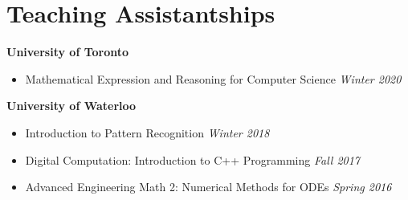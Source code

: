 \section*{Teaching Assistantships}
    \vspace{\postsubhead}
    \textbf{University of Toronto}
      \begin{itemize}
        \item Mathematical Expression and Reasoning for Computer Science
          \hfill
      	 \textit{Winter 2020}
      \end{itemize}
    \textbf{University of Waterloo}
      \begin{itemize}
        \item Introduction to Pattern Recognition
          \hfill
      	 \textit{Winter 2018}
      \end{itemize}
	
      \begin{itemize}
        \item Digital Computation: Introduction to C++ Programming
          \hfill
      	 \textit{Fall 2017}

      \end{itemize}
      \begin{itemize}
        \item Advanced Engineering Math 2: Numerical Methods for ODEs
          \hfill
      	 \textit{Spring 2016}
      \end{itemize}
   \vspace{\interlist}
   
